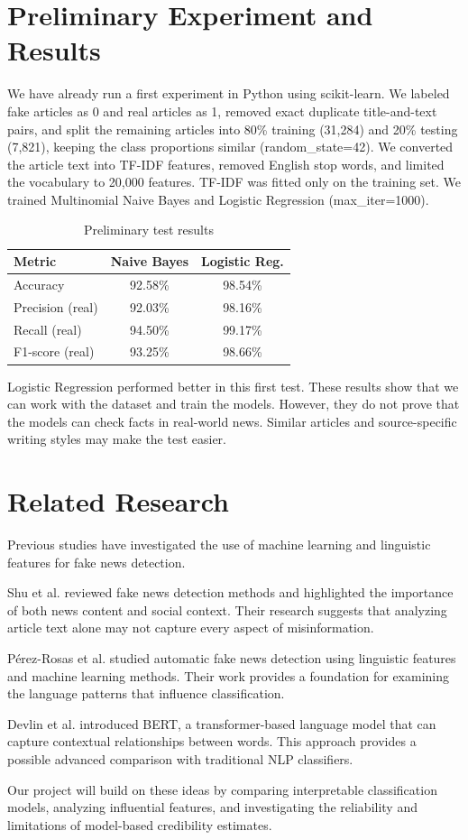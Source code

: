 \documentclass[conference]{IEEEtran}
\begin{document}
\section{Preliminary Experiment and Results}
We have already run a first experiment in Python using scikit-learn. We labeled fake articles as 0 and real articles as 1, removed exact duplicate title-and-text pairs, and split the remaining articles into 80\% training (31,284) and 20\% testing (7,821), keeping the class proportions similar (random\_state=42). We converted the article text into TF-IDF features, removed English stop words, and limited the vocabulary to 20,000 features. TF-IDF was fitted only on the training set. We trained Multinomial Naive Bayes and Logistic Regression (max\_iter=1000).\par
\begin{table}[t]\centering\caption{Preliminary test results}\label{tab:baseline}\footnotesize
\begin{tabular}{lcc}\toprule
Metric & Naive Bayes & Logistic Reg. \\
\midrule
Accuracy & 92.58\% & 98.54\% \\
Precision (real) & 92.03\% & 98.16\% \\
Recall (real) & 94.50\% & 99.17\% \\
F1-score (real) & 93.25\% & 98.66\% \\
\bottomrule\end{tabular}
\end{table}
Logistic Regression performed better in this first test. These results show that we can work with the dataset and train the models. However, they do not prove that the models can check facts in real-world news. Similar articles and source-specific writing styles may make the test easier.\par
\section{Related Research}
Previous studies have investigated the use of machine learning and linguistic features for fake news detection.\par
Shu et al. \cite{shu2017} reviewed fake news detection methods and highlighted the importance of both news content and social context. Their research suggests that analyzing article text alone may not capture every aspect of misinformation.\par
Pérez-Rosas et al. \cite{perezrosas2018} studied automatic fake news detection using linguistic features and machine learning methods. Their work provides a foundation for examining the language patterns that influence classification.\par
Devlin et al. \cite{devlin2019} introduced BERT, a transformer-based language model that can capture contextual relationships between words. This approach provides a possible advanced comparison with traditional NLP classifiers.\par
Our project will build on these ideas by comparing interpretable classification models, analyzing influential features, and investigating the reliability and limitations of model-based credibility estimates.\par
\end{document}
